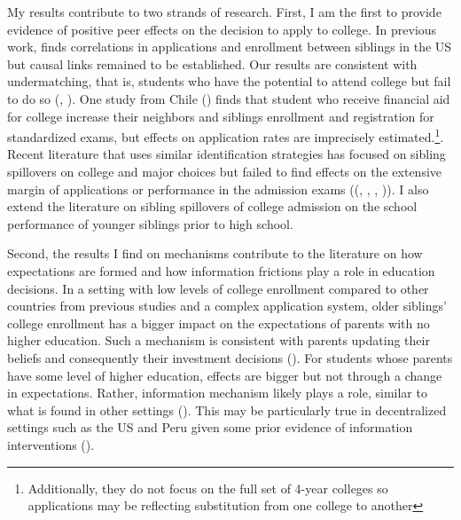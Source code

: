 
My results contribute to two strands of research. First, I am the first to provide evidence of positive peer effects on the decision to apply to college. In previous work, \cite{goodman_relationship_2015} finds correlations in applications and enrollment between siblings in the US but causal links remained to be established. Our results are consistent with undermatching, that is, students who have the potential to attend college but fail to do so (\cite{black_under_2013}, \cite{hoxby_missing_2012}). One study from Chile (\cite{barrios-fernandez_neighbors_2022}) finds that student who receive financial aid for college increase their neighbors and siblings enrollment and registration for standardized exams, but effects on application rates are imprecisely estimated.\footnote{Additionally, they do not focus on the full set of 4-year colleges so applications may be reflecting substitution from one college to another}. Recent literature that uses similar identification strategies has focused on sibling spillovers on college and major choices but failed to find effects on the extensive margin of applications or performance in the admission exams ((\cite{altmejd_o_2021}, \cite{dahl_intergenerational_2024}, \cite{avdeev_spillovers_2024}, \cite{aguirre_walking_2021})). I also extend the literature on sibling spillovers of college admission on the school performance of younger siblings prior to high school. %


Second, the results I find on mechanisms contribute to the literature on how expectations are formed and how information frictions play a role in education decisions. In a setting with low levels of college enrollment compared to other countries from previous studies and a complex application system, older siblings' college enrollment has a bigger impact on the expectations of parents with no higher education. Such a mechanism is consistent with parents updating their beliefs and consequently their investment decisions (\cite{dizon-ross_parents_2019}). For students whose parents have some level of higher education, effects are bigger but not through a change in expectations. Rather, information mechanism likely plays a role, similar to what is found in other settings (\cite{altmejd_o_2021}). This may be particularly true in decentralized settings such as the US and Peru given some prior evidence of information interventions (\cite{dynarski_closing_2021}). 

